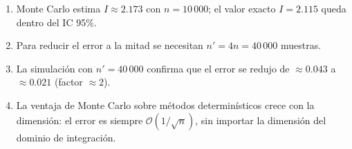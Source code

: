 \documentclass[12pt,a4paper]{article}
\begin{document}
\begin{enumerate}
  \item Monte Carlo estima $I \approx 2.173$ con $n=10\,000$; el valor exacto
        $I = 2.115$ queda dentro del IC 95\%.
  \item Para reducir el error a la mitad se necesitan $n' = 4n = 40\,000$ muestras.
  \item La simulaci\'on con $n'=40\,000$ confirma que el error se redujo de
        $\approx 0.043$ a $\approx 0.021$ (factor $\approx 2$).
  \item La ventaja de Monte Carlo sobre m\'etodos determin\'isticos crece con la
        dimensi\'on: el error es siempre $\mathcal{O}(1/\!\sqrt{n})$,
        sin importar la dimensi\'on del dominio de integraci\'on.
\end{enumerate}
\end{document}
